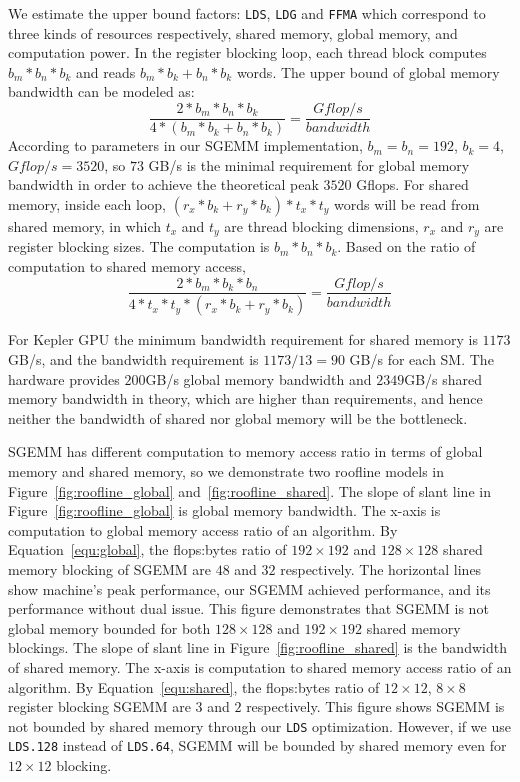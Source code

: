 We estimate the upper bound factors: {\tt LDS}, {\tt LDG} and {\tt FFMA} which correspond to three kinds of resources respectively, 
shared
memory, global memory, and computation power. In the register blocking loop, each thread block computes $b_m*b_n*b_k$ and reads $b_m*b_k+b_n*b_k$ words. The upper bound of global memory bandwidth can be modeled as:
\begin{equation}
    \frac{2*b_m*b_n*b_k}{4*(b_m*b_k + b_n*b_k)} = \frac{Gflop/s}{bandwidth}
    \label{equ:global}
\end{equation}
According to parameters in our SGEMM implementation, $b_m=b_n=192$, $b_k=4$, $Gflop/s=3520$, so $73$ GB/s is the minimal
requirement for global memory bandwidth in order to achieve the theoretical peak $3520$ Gflops.
For shared memory, inside each loop, $(r_x*b_k + r_y * b_k)*t_x*t_y$ words will be read from shared memory, in which $t_x$ and
$t_y$ are thread blocking dimensions, $r_x$ and $r_y$ are register blocking sizes. The computation is $b_m*b_n*b_k$. Based on the ratio of computation to shared memory access,
\begin{equation}
    \frac{2*b_m*b_k*b_n}{4*t_x*t_y*(r_x*b_k + r_y *b_k)}  = \frac{Gflop/s}{bandwidth}
    \label{equ:shared}
\end{equation}


For Kepler GPU the minimum bandwidth requirement for shared memory is $1173$GB/s, and the bandwidth requirement is
$1173/13=90$ GB/s for each SM. The hardware provides $200$GB/s global memory bandwidth and $2349$GB/s shared memory bandwidth in theory, which are higher than requirements, and hence neither the bandwidth of shared nor global memory will be the bottleneck.

SGEMM has different computation to memory access ratio in terms of global memory and shared memory, so we demonstrate
two roofline models in Figure~\ref{fig:roofline_global} and~\ref{fig:roofline_shared}. 
The slope of slant line in Figure~\ref{fig:roofline_global} is global memory bandwidth. The x-axis is computation to global
memory access ratio of an algorithm. 
By Equation~\ref{equ:global}, the flops:bytes ratio of $192\times192$ and $128\times128$ shared 
memory blocking of SGEMM are $48$ and $32$ respectively. The horizontal lines show machine's peak performance, our SGEMM
achieved performance, and its performance without dual issue.
This figure demonstrates that SGEMM is not global memory bounded for both $128\times128$ and $192\times 192$ shared memory blockings.
The slope of slant line in Figure~\ref{fig:roofline_shared} is the bandwidth of shared memory. The x-axis is computation to
shared memory access ratio of an algorithm. 
By Equation~\ref{equ:shared}, the flops:bytes ratio of $12\times12$, $8\times8$ register blocking SGEMM are $3$ and $2$ respectively. 
This figure shows SGEMM is not bounded by shared memory through our {\tt LDS} optimization. 
However, if we use {\tt LDS.128} instead of {\tt LDS.64}, SGEMM will be bounded by shared memory even for $12\times 12$ blocking.

